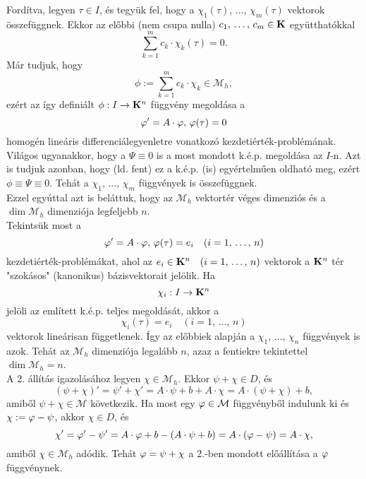 Fordítva, legyen $\tau \in I$, és tegyük fel, hogy a $\chi_1(\tau), \, \dots, \, \chi_m(\tau)$ vektorok összefüggnek. Ekkor az előbbi (nem csupa nulla) $c_1, \, \dots, \, c_m \in \mathbf{K}$ együtthatókkal
\[
	\sum_{k=1}^m c_k \cdot \chi_k(\tau) = 0.
\]
Már tudjuk, hogy
\[
	\phi := \sum_{k=1}^m c_k \cdot \chi_k \in \mathcal{M}_h,
\]
ezért az így definiált $\phi : I \to \mathbf{K}^n$ függvény megoldása a
\[
	\varphi' = A \cdot \varphi, \, \varphi(\tau) = 0
\]
homogén lineáris differenciálegyenletre vonatkozó kezdetiérték-problémának. Világos ugyanakkor, hogy a $\Psi \equiv 0$ is a most mondott k.é.p. megoldása az $I$-n. Azt is tudjuk azonban, hogy (ld. fent) ez a k.é.p. (is) egyértelműen oldható meg, ezért $\phi \equiv \Psi \equiv 0$. Tehát a $\chi_1, \, \dots, \, \chi_m$ függvények is összefüggnek.\\

Ezzel egyúttal azt is beláttuk, hogy az $\mathcal{M}_h$ vektortér véges dimenziós és a $\dim \mathcal{M}_h$ dimenziója legfeljebb $n$.\\

Tekintsük most a
\[
	\varphi' = A \cdot \varphi, \, \varphi(\tau) = e_i  \quad (i = 1, \, \dots, \, n)
\]
kezdetiérték-problémákat, ahol az $e_i \in \mathbf{K}^n \quad (i = 1, \, \dots, \, n)$ vektorok a $\mathbf{K}^n$ tér "szokásos" (kanonikus) bázisvektorait jelölik. Ha
\[
	\chi_i : I \to \mathbf{K}^n
\]
jelöli az említett k.é.p. teljes megoldását, akkor a
\[
	\chi_i(\tau) = e_i \quad (i = 1, \, \dots, \, n)
\]
vektorok lineárisan függetlenek. Így az előbbiek alapján a $\chi_1, \, \dots, \, \chi_n$ függvények is azok. Tehát az $\mathcal{M}_h$ dimenziója legalább $n$, azaz a fentiekre tekintettel $\dim \mathcal{M}_h = n$.\\

A 2. állítás igazolásához legyen $\chi \in \mathcal{M}_h$. Ekkor $\psi + \chi \in D$, és
\[
	(\psi + \chi)' = \psi' + \chi' = A \cdot \psi + b + A \cdot \chi = A \cdot (\psi + \chi) + b,
\]
amiből $\psi + \chi \in \mathcal{M}$ következik. Ha most egy $\varphi \in \mathcal{M}$ függvényből indulunk ki és $\chi := \varphi - \psi$, akkor $\chi \in D$, és 
\[
	\chi' = \varphi' - \psi' = A \cdot \varphi + b - (A \cdot \psi + b) = A \cdot (\varphi - \psi) = A \cdot \chi,
\]
amiből $\chi \in \mathcal{M}_h$ adódik. Tehát $\varphi = \psi + \chi$ a 2.-ben mondott előállítása a $\varphi$ függvénynek.\\

